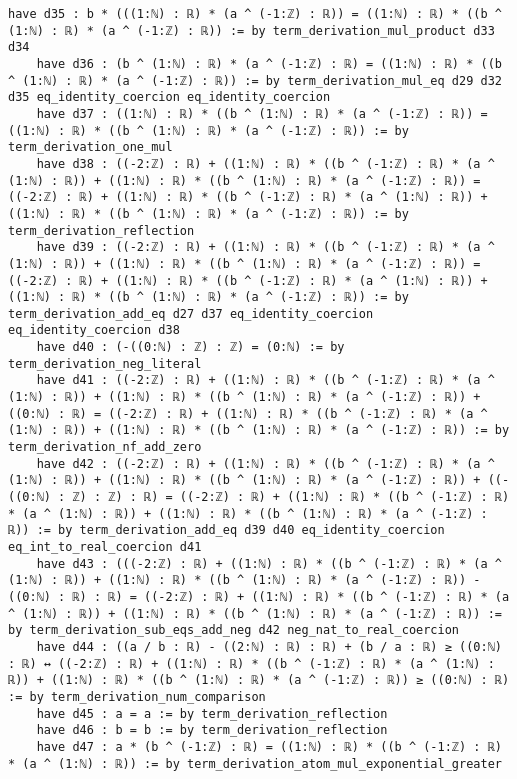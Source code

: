 \documentclass{article}
\begin{document}
\begin{tcolorbox}[colback=white!10, width=\linewidth]
\begin{lstlisting}[language=Lean4]
    have d35 : b * (((1:ℕ) : ℝ) * (a ^ (-1:ℤ) : ℝ)) = ((1:ℕ) : ℝ) * ((b ^ (1:ℕ) : ℝ) * (a ^ (-1:ℤ) : ℝ)) := by term_derivation_mul_product d33 d34
    have d36 : (b ^ (1:ℕ) : ℝ) * (a ^ (-1:ℤ) : ℝ) = ((1:ℕ) : ℝ) * ((b ^ (1:ℕ) : ℝ) * (a ^ (-1:ℤ) : ℝ)) := by term_derivation_mul_eq d29 d32 d35 eq_identity_coercion eq_identity_coercion
    have d37 : ((1:ℕ) : ℝ) * ((b ^ (1:ℕ) : ℝ) * (a ^ (-1:ℤ) : ℝ)) = ((1:ℕ) : ℝ) * ((b ^ (1:ℕ) : ℝ) * (a ^ (-1:ℤ) : ℝ)) := by term_derivation_one_mul
    have d38 : ((-2:ℤ) : ℝ) + ((1:ℕ) : ℝ) * ((b ^ (-1:ℤ) : ℝ) * (a ^ (1:ℕ) : ℝ)) + ((1:ℕ) : ℝ) * ((b ^ (1:ℕ) : ℝ) * (a ^ (-1:ℤ) : ℝ)) = ((-2:ℤ) : ℝ) + ((1:ℕ) : ℝ) * ((b ^ (-1:ℤ) : ℝ) * (a ^ (1:ℕ) : ℝ)) + ((1:ℕ) : ℝ) * ((b ^ (1:ℕ) : ℝ) * (a ^ (-1:ℤ) : ℝ)) := by term_derivation_reflection
    have d39 : ((-2:ℤ) : ℝ) + ((1:ℕ) : ℝ) * ((b ^ (-1:ℤ) : ℝ) * (a ^ (1:ℕ) : ℝ)) + ((1:ℕ) : ℝ) * ((b ^ (1:ℕ) : ℝ) * (a ^ (-1:ℤ) : ℝ)) = ((-2:ℤ) : ℝ) + ((1:ℕ) : ℝ) * ((b ^ (-1:ℤ) : ℝ) * (a ^ (1:ℕ) : ℝ)) + ((1:ℕ) : ℝ) * ((b ^ (1:ℕ) : ℝ) * (a ^ (-1:ℤ) : ℝ)) := by term_derivation_add_eq d27 d37 eq_identity_coercion eq_identity_coercion d38
    have d40 : (-((0:ℕ) : ℤ) : ℤ) = (0:ℕ) := by term_derivation_neg_literal
    have d41 : ((-2:ℤ) : ℝ) + ((1:ℕ) : ℝ) * ((b ^ (-1:ℤ) : ℝ) * (a ^ (1:ℕ) : ℝ)) + ((1:ℕ) : ℝ) * ((b ^ (1:ℕ) : ℝ) * (a ^ (-1:ℤ) : ℝ)) + ((0:ℕ) : ℝ) = ((-2:ℤ) : ℝ) + ((1:ℕ) : ℝ) * ((b ^ (-1:ℤ) : ℝ) * (a ^ (1:ℕ) : ℝ)) + ((1:ℕ) : ℝ) * ((b ^ (1:ℕ) : ℝ) * (a ^ (-1:ℤ) : ℝ)) := by term_derivation_nf_add_zero
    have d42 : ((-2:ℤ) : ℝ) + ((1:ℕ) : ℝ) * ((b ^ (-1:ℤ) : ℝ) * (a ^ (1:ℕ) : ℝ)) + ((1:ℕ) : ℝ) * ((b ^ (1:ℕ) : ℝ) * (a ^ (-1:ℤ) : ℝ)) + ((-((0:ℕ) : ℤ) : ℤ) : ℝ) = ((-2:ℤ) : ℝ) + ((1:ℕ) : ℝ) * ((b ^ (-1:ℤ) : ℝ) * (a ^ (1:ℕ) : ℝ)) + ((1:ℕ) : ℝ) * ((b ^ (1:ℕ) : ℝ) * (a ^ (-1:ℤ) : ℝ)) := by term_derivation_add_eq d39 d40 eq_identity_coercion eq_int_to_real_coercion d41
    have d43 : (((-2:ℤ) : ℝ) + ((1:ℕ) : ℝ) * ((b ^ (-1:ℤ) : ℝ) * (a ^ (1:ℕ) : ℝ)) + ((1:ℕ) : ℝ) * ((b ^ (1:ℕ) : ℝ) * (a ^ (-1:ℤ) : ℝ)) - ((0:ℕ) : ℝ) : ℝ) = ((-2:ℤ) : ℝ) + ((1:ℕ) : ℝ) * ((b ^ (-1:ℤ) : ℝ) * (a ^ (1:ℕ) : ℝ)) + ((1:ℕ) : ℝ) * ((b ^ (1:ℕ) : ℝ) * (a ^ (-1:ℤ) : ℝ)) := by term_derivation_sub_eqs_add_neg d42 neg_nat_to_real_coercion
    have d44 : ((a / b : ℝ) - ((2:ℕ) : ℝ) : ℝ) + (b / a : ℝ) ≥ ((0:ℕ) : ℝ) ↔ ((-2:ℤ) : ℝ) + ((1:ℕ) : ℝ) * ((b ^ (-1:ℤ) : ℝ) * (a ^ (1:ℕ) : ℝ)) + ((1:ℕ) : ℝ) * ((b ^ (1:ℕ) : ℝ) * (a ^ (-1:ℤ) : ℝ)) ≥ ((0:ℕ) : ℝ) := by term_derivation_num_comparison
    have d45 : a = a := by term_derivation_reflection
    have d46 : b = b := by term_derivation_reflection
    have d47 : a * (b ^ (-1:ℤ) : ℝ) = ((1:ℕ) : ℝ) * ((b ^ (-1:ℤ) : ℝ) * (a ^ (1:ℕ) : ℝ)) := by term_derivation_atom_mul_exponential_greater

\end{lstlisting}
\end{tcolorbox}
\end{document}

